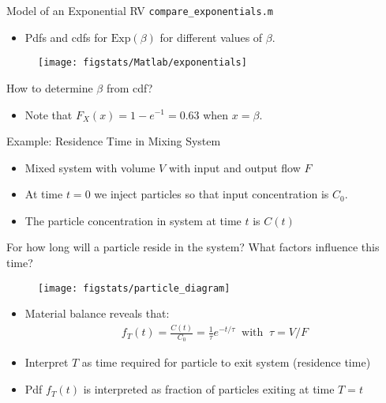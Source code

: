 \documentclass[9pt]{beamer}
\begin{document}
%
\begin{frame}{Model of an Exponential RV \footnotesize{\texttt{compare\_exponentials.m}}}
\begin{itemize}
\item Pdfs and cdfs for $\textrm{Exp}(\beta)$ for different values of $\beta$.
\end{itemize}
\begin{figure}[!htb]
    \centering
	\texttt{[image: figstats/Matlab/exponentials]}
\end{figure}
\begin{block}{}
\begin{center}
How to determine $\beta$ from cdf? 
\end{center}
\end{block}
\pause
\begin{itemize}
\item Note that $F_X(x)=1-e^{-1}=0.63$ when $x=\beta$. 
\end{itemize}
\end{frame}

%
\begin{frame}{Example: Residence Time in Mixing System}
\begin{itemize}
\setlength{\itemsep}{10pt}
\item  Mixed system with volume $V$ with input and output flow $F$
\item At time $t=0$ we inject particles so that input concentration is $C_0$.
\item The particle concentration in system at time $t$ is $C(t)$
\end{itemize}
\begin{block}{}
For how long will a particle reside in the system?  What factors influence this time? 
\end{block}
\begin{figure}[!htb]
    \centering
	\texttt{[image: figstats/particle\_diagram]}
\end{figure}
\pause
\begin{itemize}
\item Material balance reveals that:
\begin{align*}
f_T(t)=\frac{C(t)}{C_0}= \frac{1}{\tau}e^{-t/\tau}\;\; \textrm{with}\;\; \tau=V/F
\end{align*}
\item Interpret $T$ as time required for particle to exit system (residence time)
\item Pdf $f_T(t)$ is interpreted as fraction of particles exiting at time $T=t$
\end{itemize}
\end{frame}
\end{document}
